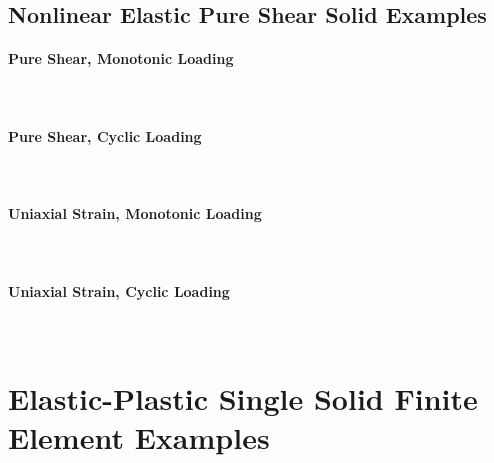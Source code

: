 \documentclass[fleqn,11pt]{article}
\begin{document}
\subsection{Nonlinear Elastic Pure Shear Solid Examples}

\paragraph{Pure Shear, Monotonic Loading} ~

\paragraph{Pure Shear, Cyclic Loading} ~


\paragraph{Uniaxial Strain, Monotonic Loading} ~

\paragraph{Uniaxial Strain, Cyclic Loading} ~




\section{Elastic-Plastic Single Solid Finite Element Examples}

\end{document}

